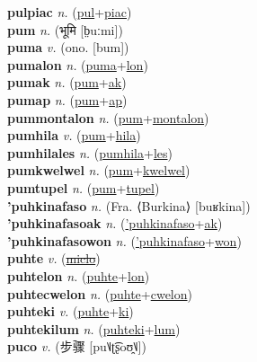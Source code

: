 \textbf{pulpiac} \textit{n.} (\hyperref[pul]{pul}+\hyperref[piac]{piac})
 \label{pulpiac} \\
\textbf{pum} \textit{n.} ({\devanagari{}भूमि} [b̤uːmi])
 \label{pum} \\
\textbf{puma} \textit{v.} (ono. [bum])
 \label{puma} \\
\textbf{pumalon} \textit{n.} (\hyperref[puma]{puma}+\hyperref[lon]{lon})
 \label{pumalon} \\
\textbf{pumak} \textit{n.} (\hyperref[pum]{pum}+\hyperref[ak]{ak})
 \label{pumak} \\
\textbf{pumap} \textit{n.} (\hyperref[pum]{pum}+\hyperref[ap]{ap})
 \label{pumap} \\
\textbf{pummontalon} \textit{n.} (\hyperref[pum]{pum}+\hyperref[montalon]{montalon})
 \label{pummontalon} \\
\textbf{pumhila} \textit{v.} (\hyperref[pum]{pum}+\hyperref[hila]{hila})
 \label{pumhila} \\
\textbf{pumhilales} \textit{n.} (\hyperref[pumhila]{pumhila}+\hyperref[les]{les})
 \label{pumhilales} \\
\textbf{pumkwelwel} \textit{n.} (\hyperref[pum]{pum}+\hyperref[kwelwel]{kwelwel})
 \label{pumkwelwel} \\
\textbf{pumtupel} \textit{n.} (\hyperref[pum]{pum}+\hyperref[tupel]{tupel})
 \label{pumtupel} \\
\textbf{'puhkinafaso} \textit{n.} (Fra. ⟨Burkina⟩ [buʁkina])
 \label{'puhkinafaso} \\
\textbf{'puhkinafasoak} \textit{n.} (\hyperref['puhkinafaso]{'puhkinafaso}+\hyperref[ak]{ak})
 \label{'puhkinafasoak} \\
\textbf{'puhkinafasowon} \textit{n.} (\hyperref['puhkinafaso]{'puhkinafaso}+\hyperref[won]{won})
 \label{'puhkinafasowon} \\
\textbf{puhte} \textit{v.} (\hyperref[miclo]{\sout{miclo}})
 \label{puhte} \\
\textbf{puhtelon} \textit{n.} (\hyperref[puhte]{puhte}+\hyperref[lon]{lon})
 \label{puhtelon} \\
\textbf{puhtecwelon} \textit{n.} (\hyperref[puhte]{puhte}+\hyperref[cwelon]{cwelon})
 \label{puhtecwelon} \\
\textbf{puhteki} \textit{v.} (\hyperref[puhte]{puhte}+\hyperref[ki]{ki})
 \label{puhteki} \\
\textbf{puhtekilum} \textit{n.} (\hyperref[puhteki]{puhteki}+\hyperref[lum]{lum})
 \label{puhtekilum} \\
\textbf{puco} \textit{v.} ({\chinese{}步骤} [pu˥˩ʈ͡ʂoʊ̯˥˩])
